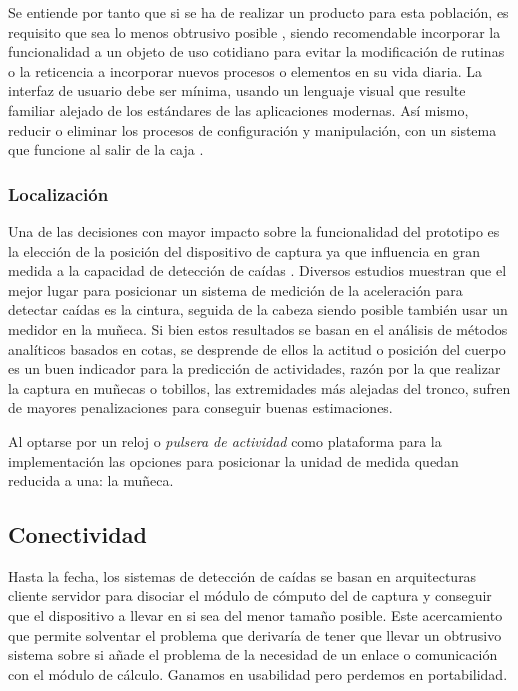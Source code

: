 Se entiende por tanto que si se ha de realizar un producto para esta población, es requisito que sea lo menos obtrusivo posible , siendo recomendable incorporar la funcionalidad a un objeto de uso cotidiano para evitar la modificación de rutinas o la reticencia a incorporar nuevos procesos o elementos en su vida diaria. La interfaz de usuario debe ser mínima, usando un lenguaje visual que resulte familiar alejado de los estándares de las aplicaciones modernas. Así mismo, reducir o eliminar los procesos de configuración y manipulación, con un sistema que funcione al salir de la caja .

\subsubsection{Localización}

Una de las decisiones con mayor impacto sobre la funcionalidad del prototipo es la elección de la posición del dispositivo de captura ya que influencia en gran medida a la capacidad de detección de caídas \cite{Kangas2008}. Diversos estudios muestran que el mejor lugar para posicionar un sistema de medición de la aceleración para detectar caídas es la cintura, seguida de la cabeza siendo posible también usar un medidor en la muñeca\cite{Chen2005, Kangas2008, Noury2007}. Si bien estos resultados se basan en el análisis de métodos analíticos basados en cotas, se desprende de ellos la actitud o posición del cuerpo es un buen indicador para la predicción de actividades, razón por la que realizar la captura en muñecas o tobillos, las extremidades más alejadas del tronco, sufren de mayores penalizaciones para conseguir buenas estimaciones.

Al optarse por un reloj o \textit{pulsera de actividad} como plataforma para la implementación las opciones para posicionar la unidad de medida quedan reducida a una: la muñeca.

\subsection{Conectividad}

Hasta la fecha, los sistemas de detección de caídas se basan en arquitecturas cliente servidor para disociar el módulo de cómputo del de captura y conseguir que el dispositivo a llevar en si sea del menor tamaño posible. Este acercamiento que permite solventar el problema que derivaría de tener que llevar un obtrusivo sistema sobre si añade el problema de la necesidad de un enlace o comunicación con el módulo de cálculo. Ganamos en usabilidad pero perdemos en portabilidad.

